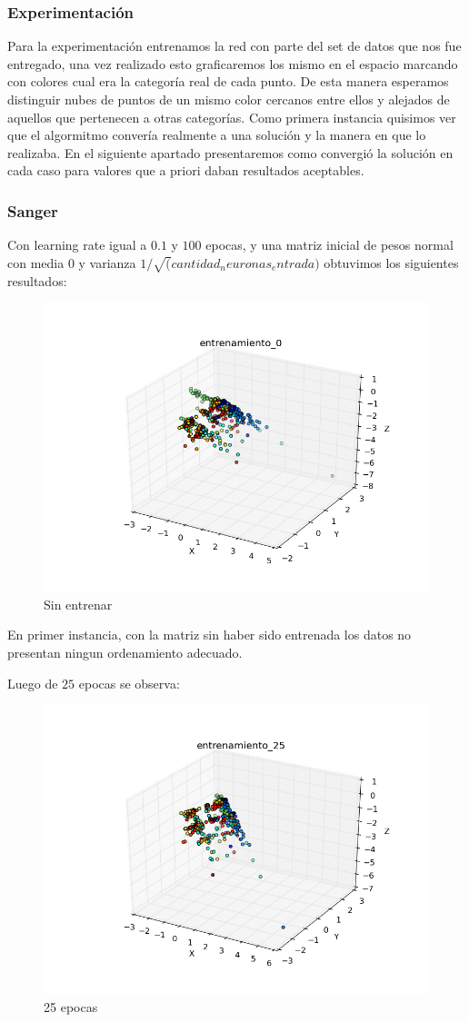 \subsubsection{Experimentación}

Para la experimentación entrenamos la red con parte del set de datos que nos fue entregado, una vez realizado esto graficaremos los mismo en el espacio marcando con colores cual era la categoría real de cada punto. De esta manera esperamos distinguir nubes de puntos de un mismo color cercanos entre ellos y alejados de aquellos que pertenecen a otras categorías. Como primera instancia quisimos ver que el algormitmo convería realmente a una solución y la manera en que lo realizaba. En el siguiente apartado presentaremos como convergió la solución en cada caso para valores que a priori daban resultados aceptables.

\subsubsection{Sanger}

Con learning rate igual a $0.1$ y $100$ epocas, y una matriz inicial de pesos normal con media 0 y varianza $1/\sqrt(cantidad_neuronas_entrada)$ obtuvimos los siguientes resultados:

\begin{figure}[h!]
\centering
  \centering
  \includegraphics[width=.6\linewidth]{img/convergencia_oja/entrenamiento_0.png}
\caption{Sin entrenar}
\label{fig:test}
\end{figure}

En primer instancia, con la matriz sin haber sido entrenada los datos no presentan ningun ordenamiento adecuado.

\pagebreak

Luego de $25$ epocas se observa: 

\begin{figure}[h!]
  \centering
  \includegraphics[width=.6\linewidth]{img/convergencia_oja/entrenamiento_25.png}
\caption{25 epocas}
\label{fig:test}
\end{figure}

